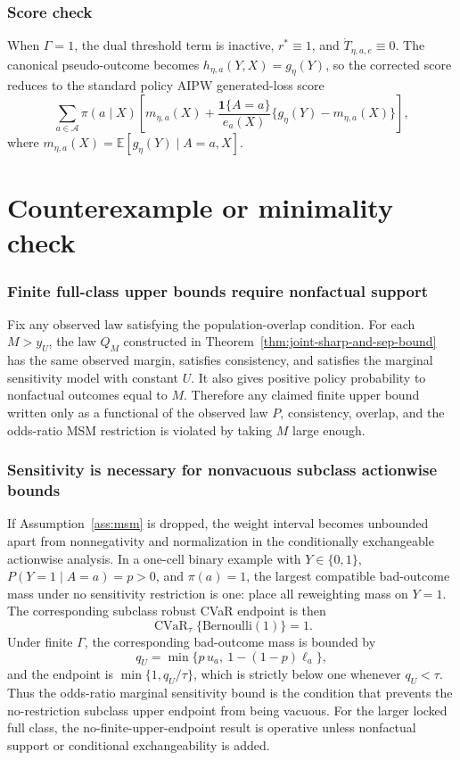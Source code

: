 \documentclass[11pt]{article}
\newcommand{\E}{\mathbb{E}}
\newcommand{\one}{\mathbf{1}}
\theoremstyle{definition}
\theoremstyle{plain}
\theoremstyle{remark}
\begin{document}
\subsubsection*{Score check}
When \(\Gamma=1\), the dual threshold term is inactive, \(r^*\equiv1\), and
\(\dot T_{\eta,a,e}\equiv0\).  The canonical pseudo-outcome becomes
\(h_{\eta,a}(Y,X)=g_\eta(Y)\), so the corrected score reduces to the standard
policy AIPW generated-loss score
\[
\sum_{a\in\mathcal A}\pi(a\mid X)
\left[
m_{\eta,a}(X)
+
\frac{\one\{A=a\}}{e_a(X)}
\{g_\eta(Y)-m_{\eta,a}(X)\}
\right],
\]
where \(m_{\eta,a}(X)=\E[g_\eta(Y)\mid A=a,X]\).

\section{Counterexample or minimality check}
\subsubsection*{Finite full-class upper bounds require nonfactual support}
Fix any observed law satisfying the population-overlap condition.  For each
\(M>y_U\), the law \(Q_M\) constructed in
Theorem~\ref{thm:joint-sharp-and-sep-bound} has the same observed margin,
satisfies consistency, and satisfies the marginal sensitivity model with
constant \(U\).  It also gives positive policy probability to nonfactual
outcomes equal to \(M\).  Therefore any claimed finite upper bound written only
as a functional of the observed law \(P\), consistency, overlap, and the
odds-ratio MSM restriction is violated by taking \(M\) large enough.

\subsubsection*{Sensitivity is necessary for nonvacuous subclass actionwise bounds}
If Assumption~\ref{ass:msm} is dropped, the weight interval becomes unbounded
apart from nonnegativity and normalization in the conditionally exchangeable
actionwise analysis.  In a one-cell binary example with \(Y\in\{0,1\}\),
\(P(Y=1\mid A=a)=p>0\), and \(\pi(a)=1\), the largest compatible bad-outcome
mass under no sensitivity restriction is one: place all reweighting mass on
\(Y=1\).  The corresponding subclass robust CVaR endpoint is then
\[
\operatorname{CVaR}_{\tau}\{\mathrm{Bernoulli}(1)\}=1.
\]
Under finite \(\Gamma\), the corresponding bad-outcome mass is bounded by
\[
q_U=\min\{p\,u_a,\ 1-(1-p)\ell_a\},
\]
and the endpoint is \(\min\{1,q_U/\tau\}\), which is strictly below one whenever
\(q_U<\tau\).  Thus the odds-ratio marginal sensitivity bound is the condition
that prevents the no-restriction subclass upper endpoint from being vacuous.
For the larger locked full class, the no-finite-upper-endpoint result is
operative unless nonfactual support or conditional exchangeability is added.
\end{document}
